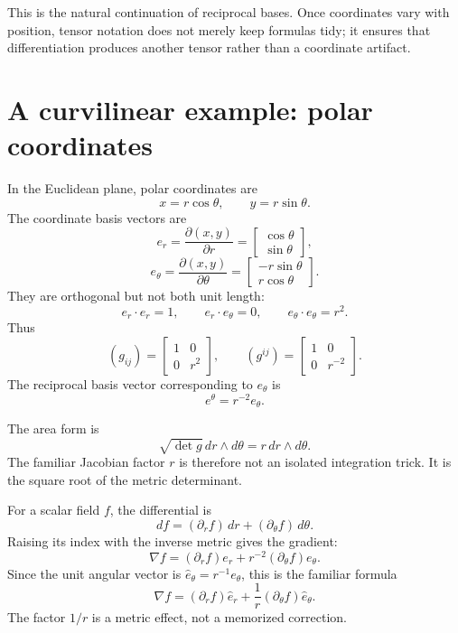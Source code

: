 This is the natural continuation of reciprocal bases.  Once coordinates vary with position, tensor notation does not merely keep formulas tidy; it ensures that differentiation produces another tensor rather than a coordinate artifact.

\section{A curvilinear example: polar coordinates}

In the Euclidean plane, polar coordinates are
\[
  x=r\cos\theta,
  \qquad
  y=r\sin\theta.
\]
The coordinate basis vectors are
\[
  e_r=\frac{\partial(x,y)}{\partial r}
  =
  \begin{bmatrix}
    \cos\theta\\
    \sin\theta
  \end{bmatrix},
\]
\[
  e_\theta=\frac{\partial(x,y)}{\partial\theta}
  =
  \begin{bmatrix}
    -r\sin\theta\\
    r\cos\theta
  \end{bmatrix}.
\]
They are orthogonal but not both unit length:
\[
  e_r\cdot e_r=1,
  \qquad
  e_r\cdot e_\theta=0,
  \qquad
  e_\theta\cdot e_\theta=r^2.
\]
Thus
\[
  (g_{ij})=
  \begin{bmatrix}
    1&0\\
    0&r^2
  \end{bmatrix},
  \qquad
  (g^{ij})=
  \begin{bmatrix}
    1&0\\
    0&r^{-2}
  \end{bmatrix}.
\]
The reciprocal basis vector corresponding to \(e_\theta\) is
\[
  e^\theta=r^{-2}e_\theta.
\]

The area form is
\[
  \sqrt{\det g}\,dr\wedge d\theta
  =r\,dr\wedge d\theta.
\]
The familiar Jacobian factor \(r\) is therefore not an isolated integration trick.  It is the square root of the metric determinant.

For a scalar field \(f\), the differential is
\[
  df=(\partial_rf)\,dr+(\partial_\theta f)\,d\theta.
\]
Raising its index with the inverse metric gives the gradient:
\[
  \nabla f
  =(\partial_rf)e_r+r^{-2}(\partial_\theta f)e_\theta.
\]
Since the unit angular vector is \(\widehat e_\theta=r^{-1}e_\theta\), this is the familiar formula
\[
  \nabla f
  =(\partial_rf)\widehat e_r
  +\frac1r(\partial_\theta f)\widehat e_\theta.
\]
The factor \(1/r\) is a metric effect, not a memorized correction.

